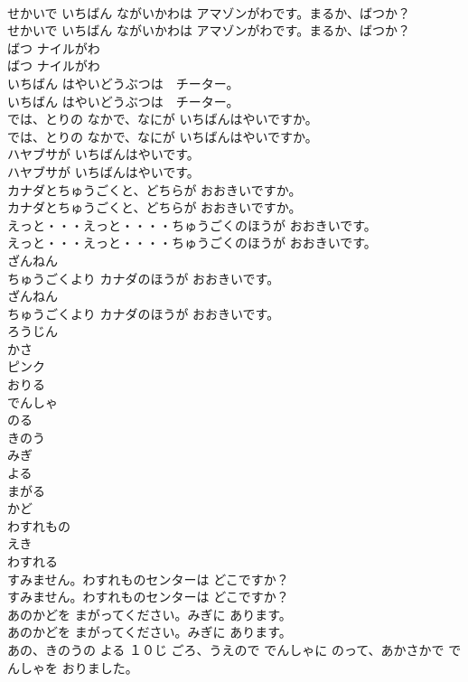 \documentclass[8pt]{extreport}
\begin{document}
\begin{CJK}{UTF8}{min}
\\	せかいで いちばん ながいかわは アマゾンがわです。まるか、ばつか？
\\	せかいで いちばん ながいかわは アマゾンがわです。まるか、ばつか？
\\	ばつ ナイルがわ
\\	ばつ ナイルがわ
\\	いちばん はやいどうぶつは　チーター。
\\	いちばん はやいどうぶつは　チーター。
\\	では、とりの なかで、なにが いちばんはやいですか。
\\	では、とりの なかで、なにが いちばんはやいですか。
\\	ハヤブサが いちばんはやいです。
\\	ハヤブサが いちばんはやいです。
\\	カナダとちゅうごくと、どちらが おおきいですか。
\\	カナダとちゅうごくと、どちらが おおきいですか。
\\	えっと・・・えっと・・・・ちゅうごくのほうが おおきいです。
\\	えっと・・・えっと・・・・ちゅうごくのほうが おおきいです。
\\	ざんねん
\\	ちゅうごくより カナダのほうが おおきいです。
\\	ざんねん
\\	ちゅうごくより カナダのほうが おおきいです。
\\	ろうじん
\\	かさ
\\	ピンク
\\	おりる
\\	でんしゃ
\\	のる
\\	きのう
\\	みぎ
\\	よる
\\	まがる
\\	かど
\\	わすれもの
\\	えき
\\	わすれる
\\	すみません。わすれものセンターは どこですか？
\\	すみません。わすれものセンターは どこですか？
\\	あのかどを まがってください。みぎに あります。
\\	あのかどを まがってください。みぎに あります。
\\	あの、きのうの よる １０じ ごろ、うえので でんしゃに のって、あかさかで でんしゃを おりました。

\end{CJK}
\end{document}
